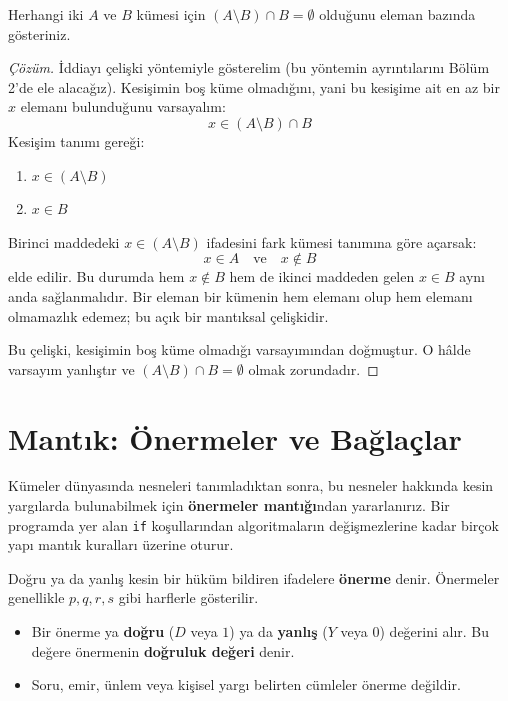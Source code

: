 \begin{example}
Herhangi iki $A$ ve $B$ kümesi için $(A \setminus B) \cap B = \emptyset$ olduğunu eleman bazında gösteriniz.
\end{example}
\begin{proof}[Çözüm]
İddiayı çelişki yöntemiyle gösterelim (bu yöntemin ayrıntılarını Bölüm 2'de ele alacağız). Kesişimin boş küme olmadığını, yani bu kesişime ait en az bir $x$ elemanı bulunduğunu varsayalım:
\[ x \in (A \setminus B) \cap B \]
Kesişim tanımı gereği:
\begin{enumerate}
  \item $x \in (A \setminus B)$
  \item $x \in B$
\end{enumerate}
Birinci maddedeki $x \in (A \setminus B)$ ifadesini fark kümesi tanımına göre açarsak:
\[ x \in A \quad \text{ve} \quad x \notin B \]
elde edilir. Bu durumda hem $x \notin B$ hem de ikinci maddeden gelen $x \in B$ aynı anda sağlanmalıdır. Bir eleman bir kümenin hem elemanı olup hem elemanı olmamazlık edemez; bu açık bir mantıksal çelişkidir.

Bu çelişki, kesişimin boş küme olmadığı varsayımından doğmuştur. O hâlde varsayım yanlıştır ve $(A \setminus B) \cap B = \emptyset$ olmak zorundadır.
\end{proof}


\section{Mantık: Önermeler ve Bağlaçlar}

Kümeler dünyasında nesneleri tanımladıktan sonra, bu nesneler hakkında kesin yargılarda bulunabilmek için \textbf{önermeler mantığı}ndan yararlanırız. Bir programda yer alan \texttt{if} koşullarından algoritmaların değişmezlerine kadar birçok yapı mantık kuralları üzerine oturur.

\begin{definition}
Doğru ya da yanlış kesin bir hüküm bildiren ifadelere \textbf{önerme} denir. Önermeler genellikle $p, q, r, s$ gibi harflerle gösterilir.
\begin{itemize}
  \item Bir önerme ya \textbf{doğru} ($D$ veya $1$) ya da \textbf{yanlış} ($Y$ veya $0$) değerini alır. Bu değere önermenin \textbf{doğruluk değeri} denir.
  \item Soru, emir, ünlem veya kişisel yargı belirten cümleler önerme değildir.
\end{itemize}
\end{definition}

